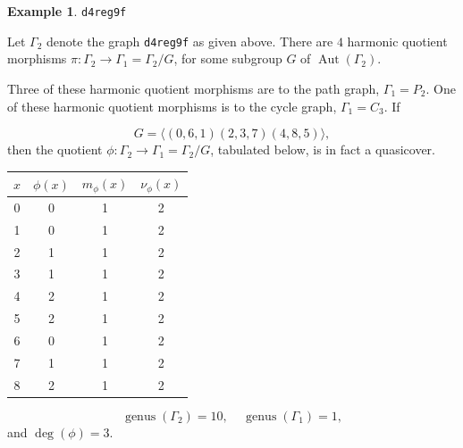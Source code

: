 \documentclass[12pt,letterpaper]{article}
\theoremstyle{definition}
\newtheorem{example}[theorem]{Example}
\DeclareMathOperator{\Aut}{Aut}
\DeclareMathOperator{\genus}{genus}
\begin{document}
\begin{example}%
\label{example:d4reg9f}
 {\tt d4reg9f}\newline
{\rm  
  Let $\Gamma_2$ denote the graph {\tt d4reg9f} as given above.
There are $4$ harmonic quotient morphisms
$\pi: \Gamma_2\to \Gamma_1=\Gamma_2/G$,
for some subgroup $G$ of $\Aut(\Gamma_2)$.

Three of these harmonic quotient morphisms are to the path graph,
$\Gamma_1=P_2$.
One of these harmonic quotient morphisms is to the cycle graph,
$\Gamma_1=C_3$.
If 

\[
G = \langle (0,6,1)(2,3,7)(4,8,5) \rangle,
\]
then the quotient $\phi: \Gamma_2\to \Gamma_1=\Gamma_2/G$,
tabulated below, is in fact a quasicover.

\begin{center}
\begin{tabular}{c|c|c|c}  
  $x$ & $\phi(x)$ & $m_\phi(x)$ & $\nu_\phi(x)$ \\ \hline
  0   &    0   &        1         &  2   \\ 
  1   &    0   &        1         &  2  \\ 
  2   &    1   &        1         &  2  \\ 
  3   &    1   &        1         &  2  \\ 
  4   &    2   &        1         &  2   \\
  5   &    2   &        1         &  2   \\
  6   &    0   &        1         &  2   \\
  7   &    1   &        1         &  2   \\
  8   &    2   &        1         &  2   \\ 
\end{tabular}
\end{center}

\[
  \genus(\Gamma_2) =10,\ \ \ \ \
  \genus(\Gamma_1) =1,
\]
and $\deg(\phi)=3$.

}
\end{example}
\end{document}
